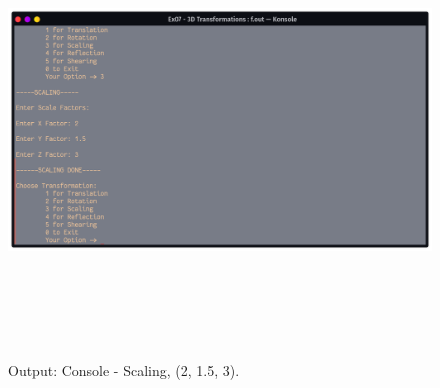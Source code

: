 \documentclass[12pt, a4]{article}
\begin{document}
\subsection*{}
\begin{figure}[h]
\centering
\caption{Output: Console - Scaling, (2, 1.5, 3).}
\includegraphics[height=12cm, width=17cm]{Outputs/Console-3.png}
\end{figure}

\newpage
\end{document}
